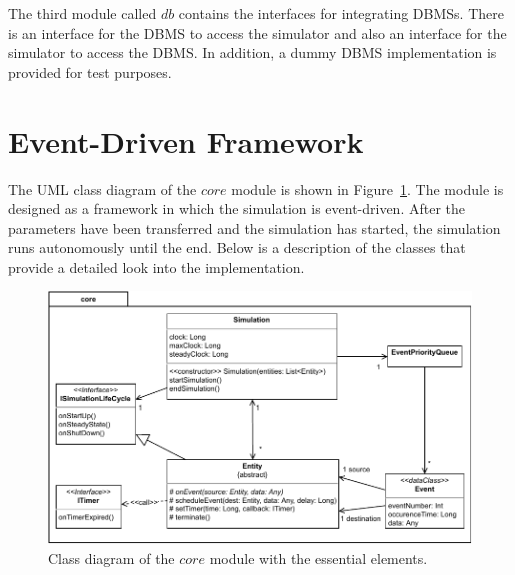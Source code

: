 \documentclass[english,version-2019-11]{uzl-thesis}
\begin{document}
The third module called $db$ contains the interfaces for integrating DBMSs. There is an interface for the DBMS to access the simulator and also an interface for the simulator to access the DBMS. In addition, a dummy DBMS implementation is provided for test purposes.

\section{Event-Driven Framework}
The UML class diagram of the $core$ module is shown in Figure~\ref{figure_des_classes}. The module is designed as a framework in which the simulation is event-driven. After the parameters have been transferred and the simulation has started, the simulation runs autonomously until the end. Below is a description of the classes that provide a detailed look into the implementation.
\begin{figure}[htpb]
  \centering
  \includegraphics{figure_des_classes.pdf}
  \caption{Class diagram of the $core$ module with the essential elements.}
  \label{figure_des_classes}
\end{figure}
\end{document}

